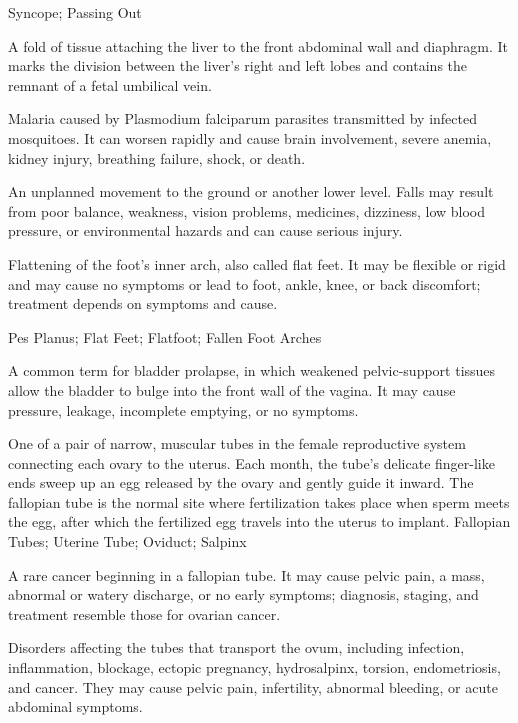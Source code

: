\synonyms
Syncope; Passing Out

 A fold of tissue attaching the liver to the front abdominal wall and diaphragm. It marks the division between the liver’s right and left lobes and contains the remnant of a fetal umbilical vein.

 Malaria caused by Plasmodium falciparum parasites transmitted by infected mosquitoes. It can worsen rapidly and cause brain involvement, severe anemia, kidney injury, breathing failure, shock, or death.

 An unplanned movement to the ground or another lower level. Falls may result from poor balance, weakness, vision problems, medicines, dizziness, low blood pressure, or environmental hazards and can cause serious injury.

 Flattening of the foot’s inner arch, also called flat feet. It may be flexible or rigid and may cause no symptoms or lead to foot, ankle, knee, or back discomfort; treatment depends on symptoms and cause.

\synonyms
Pes Planus; Flat Feet; Flatfoot; Fallen Foot Arches

 A common term for bladder prolapse, in which weakened pelvic-support tissues allow the bladder to bulge into the front wall of the vagina. It may cause pressure, leakage, incomplete emptying, or no symptoms.

 One of a pair of narrow, muscular tubes in the female reproductive system connecting each ovary to the uterus. Each month, the tube's delicate finger-like ends sweep up an egg released by the ovary and gently guide it inward. The fallopian tube is the normal site where fertilization takes place when sperm meets the egg, after which the fertilized egg travels into the uterus to implant.
\synonyms
Fallopian Tubes; Uterine Tube; Oviduct; Salpinx

 A rare cancer beginning in a fallopian tube. It may cause pelvic pain, a mass, abnormal or watery discharge, or no early symptoms; diagnosis, staging, and treatment resemble those for ovarian cancer.

 Disorders affecting the tubes that transport the ovum, including infection, inflammation, blockage, ectopic pregnancy, hydrosalpinx, torsion, endometriosis, and cancer. They may cause pelvic pain, infertility, abnormal bleeding, or acute abdominal symptoms.


